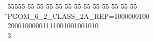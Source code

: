 %
%
\begin{tabbing}
55555 \= 55 \= 55 \= 55 \= 55 \= 55 \= 55 \= 55 \= 55 \= 55 \= 55 \= 55 \= 55 \= \>PGOM\_6\_2\_CLASS\_2A\_REP=1000000100\\[0pt]
20001000001111001001001010\\[0pt]
3\>\end{tabbing}
